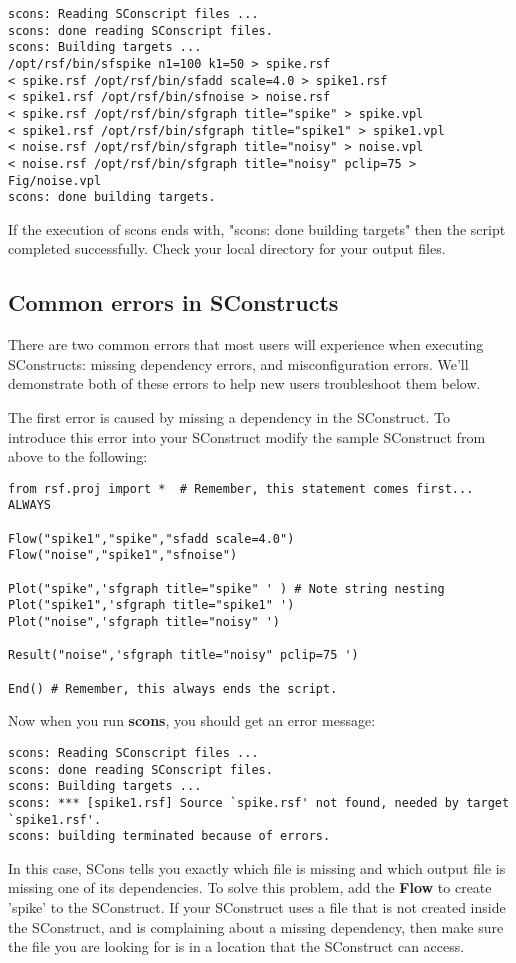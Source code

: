 \begin{verbatim}
scons: Reading SConscript files ...
scons: done reading SConscript files.
scons: Building targets ...
/opt/rsf/bin/sfspike n1=100 k1=50 > spike.rsf
< spike.rsf /opt/rsf/bin/sfadd scale=4.0 > spike1.rsf
< spike1.rsf /opt/rsf/bin/sfnoise > noise.rsf
< spike.rsf /opt/rsf/bin/sfgraph title="spike" > spike.vpl
< spike1.rsf /opt/rsf/bin/sfgraph title="spike1" > spike1.vpl
< noise.rsf /opt/rsf/bin/sfgraph title="noisy" > noise.vpl
< noise.rsf /opt/rsf/bin/sfgraph title="noisy" pclip=75 > Fig/noise.vpl
scons: done building targets.
\end{verbatim}

If the execution of scons ends with, "scons: done building targets" then the script completed successfully.  Check your local directory for your output files. 

\subsection{Common errors in SConstructs}
There are two common errors that most users will experience when executing SConstructs: missing dependency errors, and misconfiguration errors.  We'll demonstrate both of these errors to help new users troubleshoot them below. 

 The first error is caused by missing a dependency in the SConstruct.  To introduce this error into your SConstruct modify the sample SConstruct from above to the following:

\begin{lstlisting}
from rsf.proj import *  # Remember, this statement comes first... ALWAYS

Flow("spike1","spike","sfadd scale=4.0")
Flow("noise","spike1","sfnoise")

Plot("spike",'sfgraph title="spike" ' ) # Note string nesting
Plot("spike1",'sfgraph title="spike1" ') 
Plot("noise",'sfgraph title="noisy" ')

Result("noise",'sfgraph title="noisy" pclip=75 ')

End() # Remember, this always ends the script.
\end{lstlisting}
Now when you run \textbf{scons}, you should get an error message:
\begin{verbatim}
scons: Reading SConscript files ...
scons: done reading SConscript files.
scons: Building targets ...
scons: *** [spike1.rsf] Source `spike.rsf' not found, needed by target `spike1.rsf'.
scons: building terminated because of errors.
\end{verbatim}
In this case, SCons tells you exactly which file is missing and which output file is missing one of its dependencies.  To solve this problem, add the \textbf{Flow} to create 'spike' to the SConstruct.  If your SConstruct uses a file that is not created inside the SConstruct, and is complaining about a missing dependency, then make sure the file you are looking for is in a location that the SConstruct can access.

